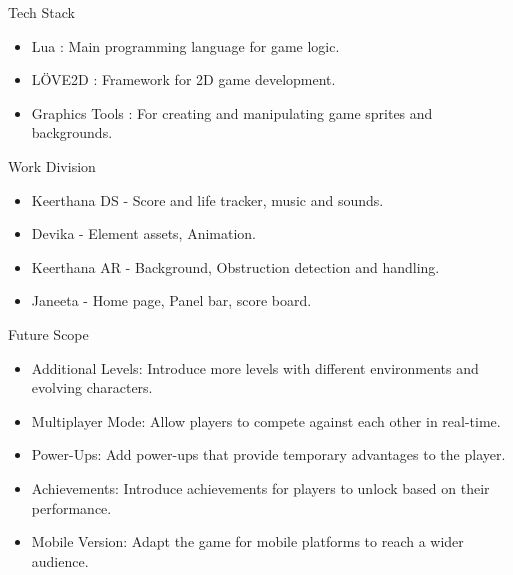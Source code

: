 \documentclass[pdf]{beamer}
\begin{document}
\begin{frame}{Tech Stack}
\begin{itemize}
    \item Lua : Main programming language for game logic.
    \item LÖVE2D : Framework for 2D game development.
    \item Graphics Tools : For creating and manipulating game sprites and backgrounds.
\end{itemize}
\end{frame}

\begin{frame}{Work Division}
    \begin{itemize}
        \item Keerthana DS - Score and life tracker, music and sounds.
        \item Devika - Element assets, Animation.
        \item Keerthana AR - Background, Obstruction detection and handling.
        \item Janeeta - Home page, Panel bar, score board.
    \end{itemize} 

\end{frame}


\begin{frame}{Future Scope}
    \begin{itemize}
        \item Additional Levels: Introduce more levels with different environments 
        and evolving characters.
        \item Multiplayer Mode: Allow players to compete against each other in real-time.
        \item Power-Ups: Add power-ups that provide temporary advantages to the player.
        \item Achievements: Introduce achievements for players to unlock based on 
        their performance.
        \item Mobile Version: Adapt the game for mobile platforms to reach a wider audience.
    \end{itemize}
\end{frame}
\end{document}
